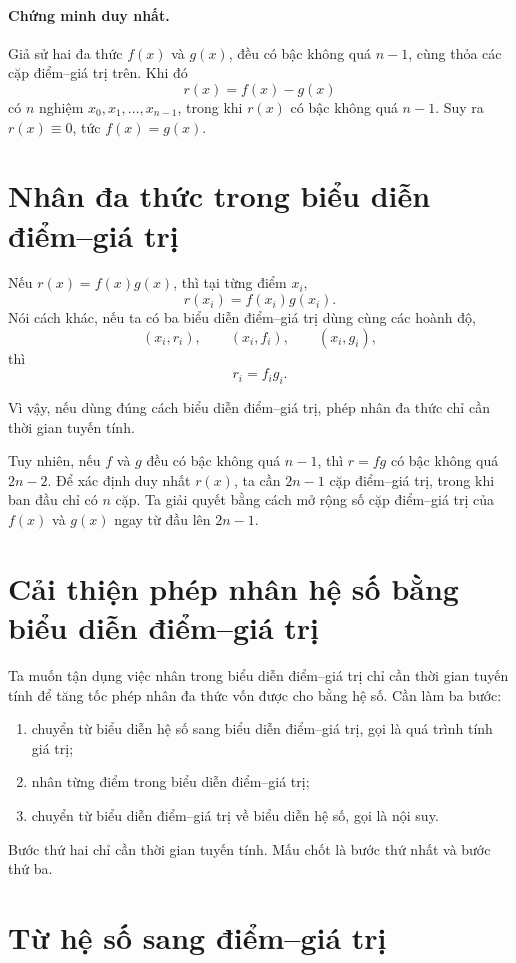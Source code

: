 \documentclass[11pt]{article}
\begin{document}
\paragraph{Chứng minh duy nhất.}
Giả sử hai đa thức \(f(x)\) và \(g(x)\), đều có bậc không quá \(n-1\), cùng
thỏa các cặp điểm--giá trị trên. Khi đó
\[
  r(x)=f(x)-g(x)
\]
có \(n\) nghiệm \(x_0,x_1,\ldots,x_{n-1}\), trong khi \(r(x)\) có bậc không
quá \(n-1\). Suy ra \(r(x)\equiv0\), tức \(f(x)=g(x)\).

\section{Nhân đa thức trong biểu diễn điểm--giá trị}

Nếu \(r(x)=f(x)g(x)\), thì tại từng điểm \(x_i\),
\[
  r(x_i)=f(x_i)g(x_i).
\]
Nói cách khác, nếu ta có ba biểu diễn điểm--giá trị dùng cùng các hoành độ,
\[
  (x_i,r_i),\qquad (x_i,f_i),\qquad (x_i,g_i),
\]
thì
\[
  r_i=f_i g_i.
\]

Vì vậy, nếu dùng đúng cách biểu diễn điểm--giá trị, phép nhân đa thức chỉ
cần thời gian tuyến tính.

Tuy nhiên, nếu \(f\) và \(g\) đều có bậc không quá \(n-1\), thì \(r=fg\) có
bậc không quá \(2n-2\). Để xác định duy nhất \(r(x)\), ta cần \(2n-1\) cặp
điểm--giá trị, trong khi ban đầu chỉ có \(n\) cặp. Ta giải quyết bằng cách
mở rộng số cặp điểm--giá trị của \(f(x)\) và \(g(x)\) ngay từ đầu lên
\(2n-1\).

\section{Cải thiện phép nhân hệ số bằng biểu diễn điểm--giá trị}

Ta muốn tận dụng việc nhân trong biểu diễn điểm--giá trị chỉ cần thời gian
tuyến tính để tăng tốc phép nhân đa thức vốn được cho bằng hệ số. Cần làm
ba bước:
\begin{enumerate}
  \item chuyển từ biểu diễn hệ số sang biểu diễn điểm--giá trị, gọi là quá
  trình tính giá trị;
  \item nhân từng điểm trong biểu diễn điểm--giá trị;
  \item chuyển từ biểu diễn điểm--giá trị về biểu diễn hệ số, gọi là nội suy.
\end{enumerate}
Bước thứ hai chỉ cần thời gian tuyến tính. Mấu chốt là bước thứ nhất và bước
thứ ba.

\section{Từ hệ số sang điểm--giá trị}
\end{document}
